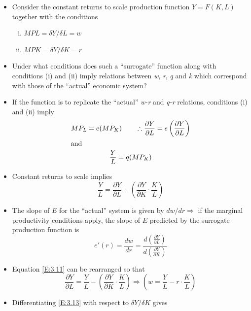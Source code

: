\documentclass[a4paper,twoside]{article}
\numberwithin{equation}{section}
\numberwithin{figure}{section}
\begin{document}
	\begin{itemize}
		\item Consider the constant returns to scale production function \( Y = F(K, L) \) together with the conditions
		\begin{enumerate}[(i)]
			\item \( MPL = \delta Y/ \delta L = w \)
			\item \( MPK = \delta Y/ \delta K = r \)
		\end{enumerate}
		\item \textcolor{myred}{Under what conditions does such a ``surrogate'' function along with conditions (i) and (ii) imply relations between  \textit{w}, \textit{r}, \textit{q} and \textit{k} which correspond with those of the ``actual'' economic system?}
		\item If the function is to replicate the ``actual'' \textit{w-r} and \textit{q-r} relations, conditions (i) and (ii) imply
		\begin{gather}
			MP_L = e(MP_K) \qquad \therefore \frac{\partial Y}{\partial L} = e\left(\frac{\partial Y}{\partial L}\right) \label{E:3.9} \\
			\intertext{and}
			\frac{Y}{L} = q(MP_K) \label{E:3.10}
		\end{gather}
		\item Constant returns to scale implies
		\begin{equation}
			\frac{Y}{L} = \frac{\partial Y}{\partial L} + \left(\frac{\partial Y}{\partial K} \cdot \frac{K}{L}\right) \label{E:3.11}
		\end{equation}
		\item The slope of \( E \) for the ``actual'' system is given by \( dw/dr \Rightarrow \) if the marginal productivity conditions apply, the slope of \( E \) predicted by the surrogate production function is
		\begin{equation}
			e'(r) = \frac{dw}{dr} = \frac{d\left(\frac{\partial Y}{\partial L}\right)}{d\left(\frac{\partial Y}{\partial K}\right)} \label{E:3.12}
		\end{equation}
		\item Equation \ref{E:3.11} can be rearranged so that
		\begin{equation}
			\frac{\partial Y}{\partial L} = \frac{Y}{L} - \left(\frac{\partial Y}{\partial K} \cdot \frac{K}{L}\right) \Rightarrow \left(w = \frac{Y}{L} - r\cdot\frac{K}{L}\right) \label{E:3.13}
		\end{equation}
		\item Differentiating \cref{E:3.13} with respect to \( \delta Y/\delta K \) gives

\end{itemize}
\end{document}
